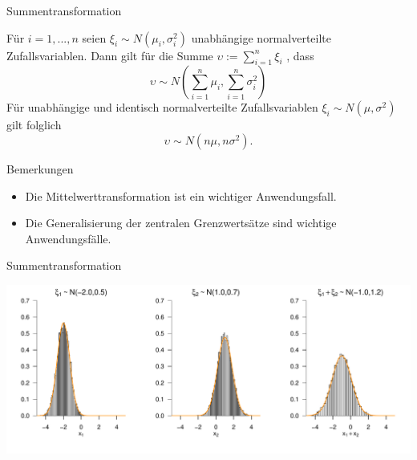 \documentclass[
  8pt,
  ignorenonframetext,
]{beamer}
\providecommand{\tightlist}{%
  \setlength{\itemsep}{0pt}\setlength{\parskip}{0pt}}
\newcommand{\ups}{\upsilon}
\begin{document}
\begin{frame}{Summentransformation}
\protect\hypertarget{summentransformation}{}
\small
\begin{theorem}
\justifying
\normalfont
Für $i = 1,...,n$ seien $\xi_i \sim N(\mu_i,\sigma^2_i)$ unabhängige normalverteilte
Zufallsvariablen. Dann gilt für die Summe $\ups := \sum_{i=1}^n \xi_i$ , dass
\begin{equation}
\ups \sim N\left(\sum_{i=1}^n \mu_i, \sum_{i=1}^n \sigma^2_i\right)
\end{equation}
Für unabhängige und identisch normalverteilte Zufallsvariablen
$\xi_i \sim N(\mu,\sigma^2)$ gilt folglich
\begin{equation}
\ups \sim N(n\mu, n \sigma^2).
\end{equation}
\end{theorem}

\footnotesize

Bemerkungen

\begin{itemize}
\tightlist
\item
  Die Mittelwerttransformation ist ein wichtiger Anwendungsfall.
\item
  Die Generalisierung der zentralen Grenzwertsätze sind wichtige
  Anwendungsfälle.
\end{itemize}
\end{frame}

\begin{frame}{Summentransformation}
\protect\hypertarget{summentransformation-1}{}
\vfill

\begin{center}\includegraphics[width=1\linewidth]{8_Abbildungen/wtfi_8_summation} \end{center}
\vfill
\end{frame}
\end{document}
